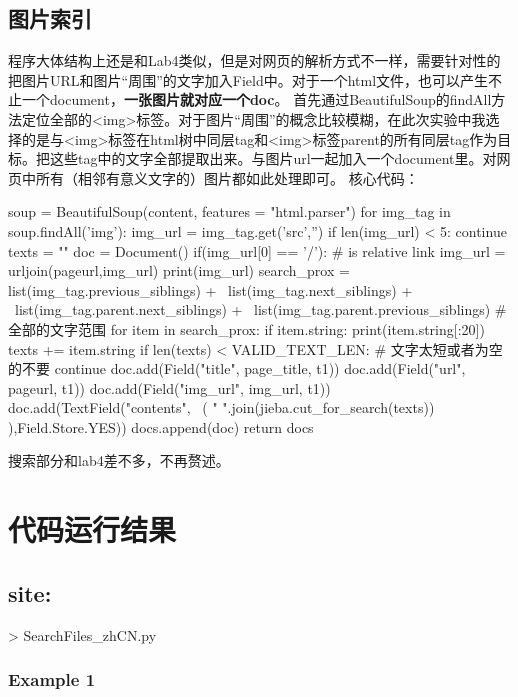 \documentclass[12pt,a4paper]{article}
\begin{document}
\subsection{图片索引}
程序大体结构上还是和Lab4类似，但是对网页的解析方式不一样，需要针对性的把图片URL和图片“周围”的文字加入Field中。对于一个html文件，也可以产生不止一个document，\textbf{一张图片就对应一个doc}。
首先通过BeautifulSoup的findAll方法定位全部的<img>标签。对于图片“周围”的概念比较模糊，在此次实验中我选择的是与<img>标签在html树中同层tag和<img>标签parent的所有同层tag作为目标。把这些tag中的文字全部提取出来。与图片url一起加入一个document里。对网页中所有（相邻有意义文字的）图片都如此处理即可。
核心代码：
\begin{python}
soup = BeautifulSoup(content, features = "html.parser")
for img_tag in soup.findAll('img'):
    img_url = img_tag.get('src','')
    if len(img_url) < 5:
        continue
    texts = ""
    doc = Document()
    if(img_url[0] == '/'): # is relative link
        img_url = urljoin(pageurl,img_url)
        print(img_url)
    search_prox = list(img_tag.previous_siblings) + \
	          list(img_tag.next_siblings) + \
                  list(img_tag.parent.next_siblings) + \
                  list(img_tag.parent.previous_siblings)
    #全部的文字范围
    for item in search_prox:
        if item.string:
            print(item.string[:20])
            texts += item.string
    if len(texts) < VALID_TEXT_LEN:   # 文字太短或者为空的不要
        continue
    doc.add(Field("title", page_title, t1))
    doc.add(Field("url", pageurl, t1))
    doc.add(Field("img_url", img_url, t1))
    doc.add(TextField("contents", \
    ( " ".join(jieba.cut_for_search(texts)) ),Field.Store.YES))
    docs.append(doc)
return docs
\end{python}
搜索部分和lab4差不多，不再赘述。
\section{代码运行结果}
\subsection{site:}
> SearchFiles{\_}zhCN.py
\subsubsection{Example 1}
\end{document}
